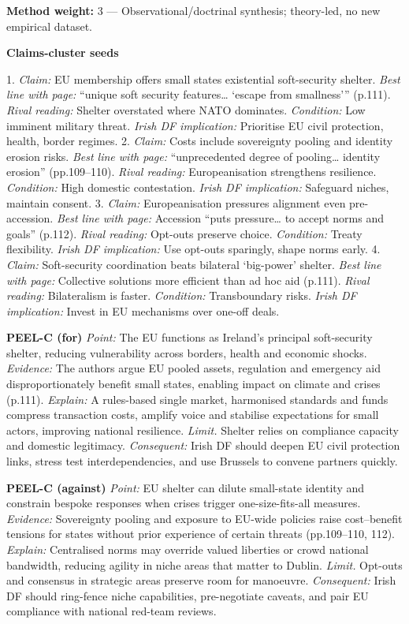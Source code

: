 \textbf{Method weight:} 3 — Observational/doctrinal synthesis; theory-led, no new empirical dataset.

\textbf{Claims-cluster seeds}

1. \textit{Claim:} EU membership offers small states existential soft-security shelter. \textit{Best line with page:} “unique soft security features… ‘escape from smallness’” (p.111).  \textit{Rival reading:} Shelter overstated where NATO dominates. \textit{Condition:} Low imminent military threat. \textit{Irish DF implication:} Prioritise EU civil protection, health, border regimes.
2. \textit{Claim:} Costs include sovereignty pooling and identity erosion risks. \textit{Best line with page:} “unprecedented degree of pooling… identity erosion” (pp.109–110).  \textit{Rival reading:} Europeanisation strengthens resilience. \textit{Condition:} High domestic contestation. \textit{Irish DF implication:} Safeguard niches, maintain consent.
3. \textit{Claim:} Europeanisation pressures alignment even pre-accession. \textit{Best line with page:} Accession “puts pressure… to accept norms and goals” (p.112).  \textit{Rival reading:} Opt-outs preserve choice. \textit{Condition:} Treaty flexibility. \textit{Irish DF implication:} Use opt-outs sparingly, shape norms early.
4. \textit{Claim:} Soft-security coordination beats bilateral ‘big-power’ shelter. \textit{Best line with page:} Collective solutions more efficient than ad hoc aid (p.111).  \textit{Rival reading:} Bilateralism is faster. \textit{Condition:} Transboundary risks. \textit{Irish DF implication:} Invest in EU mechanisms over one-off deals.

\textbf{PEEL-C (for)}
\textit{Point:} The EU functions as Ireland’s principal soft-security shelter, reducing vulnerability across borders, health and economic shocks.
\textit{Evidence:} The authors argue EU pooled assets, regulation and emergency aid disproportionately benefit small states, enabling impact on climate and crises (p.111). 
\textit{Explain:} A rules-based single market, harmonised standards and funds compress transaction costs, amplify voice and stabilise expectations for small actors, improving national resilience.
\textit{Limit.} Shelter relies on compliance capacity and domestic legitimacy.
\textit{Consequent:} Irish DF should deepen EU civil protection links, stress test interdependencies, and use Brussels to convene partners quickly.

\textbf{PEEL-C (against)}
\textit{Point:} EU shelter can dilute small-state identity and constrain bespoke responses when crises trigger one-size-fits-all measures.
\textit{Evidence:} Sovereignty pooling and exposure to EU-wide policies raise cost–benefit tensions for states without prior experience of certain threats (pp.109–110, 112).  
\textit{Explain:} Centralised norms may override valued liberties or crowd national bandwidth, reducing agility in niche areas that matter to Dublin.
\textit{Limit.} Opt-outs and consensus in strategic areas preserve room for manoeuvre. 
\textit{Consequent:} Irish DF should ring-fence niche capabilities, pre-negotiate caveats, and pair EU compliance with national red-team reviews.

